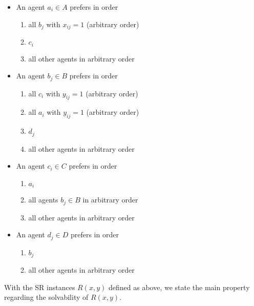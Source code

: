 \begin{multicols}{2}
\begin{itemize}
    \item An agent $a_i \in A$ prefers in order
    \begin{enumerate}
        \item all $b_j$ with $x_{i j} = 1$ (arbitrary order)
        \item $c_i$
        \item all other agents in arbitrary order
    \end{enumerate}
    \item An agent $b_j \in B$ prefers in order
    \begin{enumerate}
        \item all $c_i$ with $y_{i j} = 1$ (arbitrary order)
        \item all $a_i$ with $y_{i j} = 1$ (arbitrary order)
        \item $d_j$
        \item all other agents in arbitrary order
    \end{enumerate}
    \columnbreak

    \item An agent $c_i \in C$ prefers in order
    \begin{enumerate}
        \item $a_i$
        \item all agents $b_j \in B$ in arbitrary order
        \item all other agents in arbitrary order
    \end{enumerate}
    \item An agent $d_j \in D$ prefers in order
    \begin{enumerate}
        \item $b_j$
        \item all other agents in arbitrary order
    \end{enumerate}
    \vfill
\end{itemize}
\end{multicols}

With the SR instances $R(x, y)$ defined as above, we state the main property regarding the solvability of $R(x, y)$.

